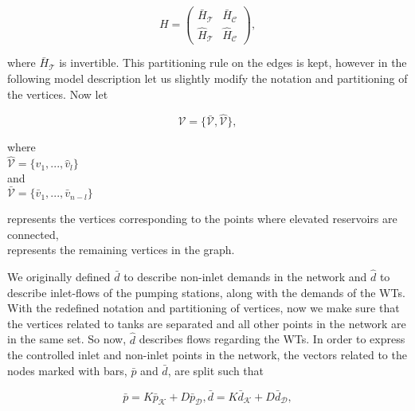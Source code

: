 \begin{equation}
\label{H_matrix_sub1}
H=
\begin{pmatrix}
\bar{H}_{\mathcal{T}} & \bar{H}_{\mathcal{C}} \\[3pt]
\hat{H}_{\mathcal{T}} & \hat{H}_{\mathcal{C}}
\end{pmatrix},
\end{equation}

where $\bar{H}_{\mathcal{T}}$ is invertible. This partitioning rule on the edges is kept, however in the following model description let us slightly modify the notation and partitioning of the vertices. Now let

\begin{equation}
  \label{vertices1_1}
  \mathcal{V} = \{\bar{\mathcal{V}}, \hat{\mathcal{V}} \}, 
\end{equation}

\begin{minipage}[t]{0.3\textwidth}
where\\
\hspace*{8mm} $\hat{\mathcal{V}} = \{\hat{v}_1, ..., \hat{v}_l\}$\\
\newline
and \\
\hspace*{8mm} $\bar{\mathcal{V}} = \{\bar{v}_1, ..., \bar{v}_{n-l}\}$ 
\end{minipage}
\begin{minipage}[t]{0.67\textwidth}
\vspace*{2mm}
 represents the vertices corresponding to the points where elevated reservoirs are connected,\\
 \newline
 represents the remaining vertices in the graph.
\end{minipage}

We originally defined $\bar{d}$ to describe non-inlet demands in the network and $\hat{d}$ to describe inlet-flows of the pumping stations, along with the demands of the WTs. With the redefined notation and partitioning of vertices, now we make sure that the vertices related to tanks are separated and all other points in the network are in the same set. So now, $\hat{d}$ describes flows regarding the WTs. In order to express the controlled inlet and non-inlet points in the network, the vectors related to the nodes marked with bars, $\bar{p}$ and $\bar{d}$, are split such that

\begin{subequations}

\begin{equation}
\label{barequation_sep1}
\bar{p} = K \bar{p}_{\mathcal{K}} + D \bar{p}_{\mathcal{D}}, 
\end{equation}

\begin{equation}
\label{barequation_sep2}
\bar{d} = K \bar{d}_{\mathcal{K}} + D \bar{d}_{\mathcal{D}},  
\end{equation}

\end{subequations}

